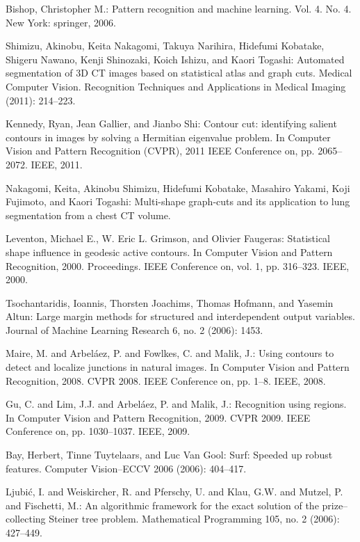 \documentclass{SMBV13}
\begin{document}
\begin{thebibliography}{AA}
 Bishop, Christopher M.: Pattern recognition and machine learning. Vol. 4. No. 4. New York: springer, 2006.

 Shimizu, Akinobu, Keita Nakagomi, Takuya Narihira, Hidefumi Kobatake, Shigeru Nawano, Kenji Shinozaki, Koich Ishizu, and Kaori Togashi: Automated segmentation of 3D CT images based on statistical atlas and graph cuts. Medical Computer Vision. Recognition Techniques and Applications in Medical Imaging (2011): 214--223.

 Kennedy, Ryan, Jean Gallier, and Jianbo Shi: Contour cut: identifying salient contours in images by solving a Hermitian eigenvalue problem. In Computer Vision and Pattern Recognition (CVPR), 2011 IEEE Conference on, pp. 2065--2072. IEEE, 2011.

 Nakagomi, Keita, Akinobu Shimizu, Hidefumi Kobatake, Masahiro Yakami, Koji Fujimoto, and Kaori Togashi: Multi-shape graph-cuts and its application to lung segmentation from a chest CT volume.

 Leventon, Michael E., W. Eric L. Grimson, and Olivier Faugeras: Statistical shape influence in geodesic active contours. In Computer Vision and Pattern Recognition, 2000. Proceedings. IEEE Conference on, vol. 1, pp. 316--323. IEEE, 2000.

 Tsochantaridis, Ioannis, Thorsten Joachims, Thomas Hofmann, and Yasemin Altun: Large margin methods for structured and interdependent output variables. Journal of Machine Learning Research 6, no. 2 (2006): 1453.

 Maire, M. and Arbel{\'a}ez, P. and Fowlkes, C. and Malik, J.: Using contours to detect and localize junctions in natural images. In Computer Vision and Pattern Recognition, 2008. CVPR 2008. IEEE Conference on, pp. 1--8. IEEE, 2008.

 Gu, C. and Lim, J.J. and Arbel{\'a}ez, P. and Malik, J.: Recognition using regions. In Computer Vision and Pattern Recognition, 2009. CVPR 2009. IEEE Conference on, pp. 1030--1037. IEEE, 2009.

 Bay, Herbert, Tinne Tuytelaars, and Luc Van Gool: Surf: Speeded up robust features. Computer Vision--ECCV 2006 (2006): 404--417.

 Ljubi{\'c}, I. and Weiskircher, R. and Pferschy, U. and Klau, G.W. and Mutzel, P. and Fischetti, M.: An algorithmic framework for the exact solution of the prize--collecting Steiner tree problem. Mathematical Programming 105, no. 2 (2006): 427--449.


\end{thebibliography}
\end{document}
